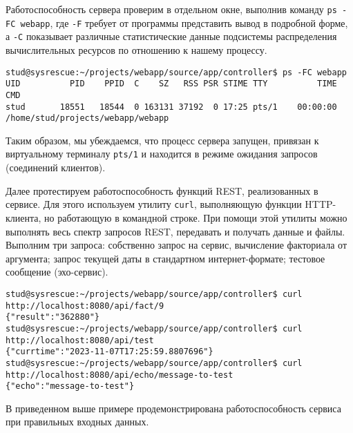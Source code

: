 \documentclass{studrep}
\begin{document}
Работоспособность сервера проверим в отдельном окне, выполнив команду \texttt{ps -FC webapp}, где \texttt{-F} требует от программы представить вывод в подробной форме, а \texttt{-C} показывает различные статистические данные подсистемы распределения вычислительных ресурсов по отношению к нашему процессу.

\begin{verbatim}
stud@sysrescue:~/projects/webapp/source/app/controller$ ps -FC webapp
UID          PID    PPID  C    SZ   RSS PSR STIME TTY          TIME CMD
stud       18551   18544  0 163131 37192  0 17:25 pts/1    00:00:00 /home/stud/projects/webapp/webapp
\end{verbatim}
Таким образом, мы убеждаемся, что процесс сервера запущен, привязан к виртуальному терминалу \texttt{pts/1} и находится в режиме ожидания запросов (соединений клиентов).

Далее протестируем работоспособность функций REST, реализованных в сервисе. Для этого используем утилиту \texttt{curl}, выполняющую функции HTTP-клиента, но работающую в командной строке.  При помощи этой утилиты можно выполнять весь спектр запросов REST, передавать и получать данные и файлы.  Выполним три запроса: собственно запрос на сервис, вычисление факториала от аргумента; запрос текущей даты в стандартном интернет-формате; тестовое сообщение (эхо-сервис).

\begin{verbatim}
stud@sysrescue:~/projects/webapp/source/app/controller$ curl http://localhost:8080/api/fact/9
{"result":"362880"}
stud@sysrescue:~/projects/webapp/source/app/controller$ curl http://localhost:8080/api/test
{"currtime":"2023-11-07T17:25:59.8807696"}
stud@sysrescue:~/projects/webapp/source/app/controller$ curl http://localhost:8080/api/echo/message-to-test
{"echo":"message-to-test"}
\end{verbatim}
В приведенном выше примере продемонстрирована работоспособность сервиса при правильных входных данных.
\end{document}
